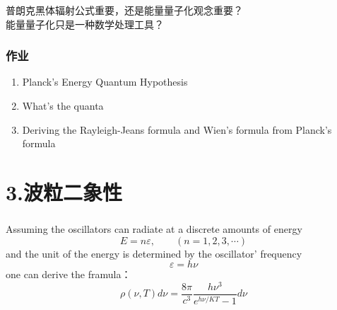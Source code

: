 
\begin{frame}
    \frametitle{}
    \begin{tcolorbox3}[学术讨论]
        普朗克黑体辐射公式重要，还是能量量子化观念重要？\\
        能量量子化只是一种数学处理工具？
    \end{tcolorbox3}
\end{frame}

\begin{frame}
    \frametitle{作业}
   \begin{enumerate}
       \item Planck's Energy Quantum Hypothesis
       \item What's the quanta
       \item Deriving the Rayleigh-Jeans formula and Wien's formula from Planck's formula
   \end{enumerate}
\end{frame}

\section{3.波粒二象性}      

\begin{frame}
    \frametitle{}
    \begin{tcolorbox3}[前情回顾]
        Assuming the oscillators can radiate at a discrete amounts of energy
        \[    E=n\varepsilon, \qquad (n=1,2,3,\cdots) \]
        and the unit of the energy is determined by the oscillator' frequency
        \[   \varepsilon=h\nu  \]
        one can derive the framula：
        \[ \rho(\nu, T) d \nu=\frac{8 \pi}{c^{3}} \frac{h \nu^{3} }{e^{h \nu / K T}-1} d \nu \]
    \end{tcolorbox3}
\end{frame}

